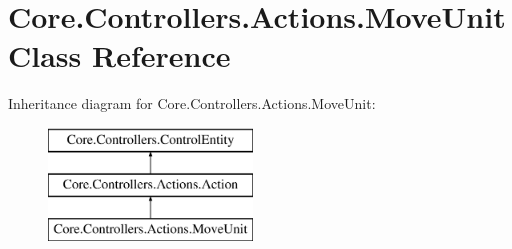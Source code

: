 \hypertarget{classCore_1_1Controllers_1_1Actions_1_1MoveUnit}{\section{Core.\-Controllers.\-Actions.\-Move\-Unit Class Reference}
\label{classCore_1_1Controllers_1_1Actions_1_1MoveUnit}
}
Inheritance diagram for Core.\-Controllers.\-Actions.\-Move\-Unit\-:\begin{figure}[H]
\begin{center}
\leavevmode
\includegraphics[height=3.000000cm]{classCore_1_1Controllers_1_1Actions_1_1MoveUnit}
\end{center}
\end{figure}
